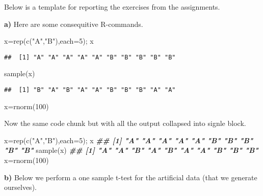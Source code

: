 \documentclass[
  11pt,
]{article}
\newenvironment{Shaded}{\begin{snugshade}}{\end{snugshade}}
\newcommand{\AttributeTok}[1]{\textcolor[rgb]{0.77,0.63,0.00}{#1}}
\newcommand{\DecValTok}[1]{\textcolor[rgb]{0.00,0.00,0.81}{#1}}
\newcommand{\DocumentationTok}[1]{\textcolor[rgb]{0.56,0.35,0.01}{\textbf{\textit{#1}}}}
\newcommand{\FunctionTok}[1]{\textcolor[rgb]{0.00,0.00,0.00}{#1}}
\newcommand{\NormalTok}[1]{#1}
\newcommand{\OtherTok}[1]{\textcolor[rgb]{0.56,0.35,0.01}{#1}}
\newcommand{\StringTok}[1]{\textcolor[rgb]{0.31,0.60,0.02}{#1}}
\begin{document}
Below is a template for reporting the exercises from the assignments.

\textbf{a)} Here are some consequitive R-commands.

\begin{Shaded}
\begin{Highlighting}[]
\NormalTok{x}\OtherTok{=}\FunctionTok{rep}\NormalTok{(}\FunctionTok{c}\NormalTok{(}\StringTok{"A"}\NormalTok{,}\StringTok{"B"}\NormalTok{),}\AttributeTok{each=}\DecValTok{5}\NormalTok{); x}
\end{Highlighting}
\end{Shaded}

\begin{verbatim}
##  [1] "A" "A" "A" "A" "A" "B" "B" "B" "B" "B"
\end{verbatim}

\begin{Shaded}
\begin{Highlighting}[]
\FunctionTok{sample}\NormalTok{(x)}
\end{Highlighting}
\end{Shaded}

\begin{verbatim}
##  [1] "B" "A" "B" "A" "A" "B" "B" "B" "A" "A"
\end{verbatim}

\begin{Shaded}
\begin{Highlighting}[]
\NormalTok{x}\OtherTok{=}\FunctionTok{rnorm}\NormalTok{(}\DecValTok{100}\NormalTok{)}
\end{Highlighting}
\end{Shaded}

Now the same code chunk but with all the output collapsed into signle
block.

\begin{Shaded}
\begin{Highlighting}[]
\NormalTok{x}\OtherTok{=}\FunctionTok{rep}\NormalTok{(}\FunctionTok{c}\NormalTok{(}\StringTok{"A"}\NormalTok{,}\StringTok{"B"}\NormalTok{),}\AttributeTok{each=}\DecValTok{5}\NormalTok{); x}
\DocumentationTok{\#\#  [1] "A" "A" "A" "A" "A" "B" "B" "B" "B" "B"}
\FunctionTok{sample}\NormalTok{(x)}
\DocumentationTok{\#\#  [1] "A" "A" "B" "A" "B" "A" "A" "B" "B" "B"}
\NormalTok{x}\OtherTok{=}\FunctionTok{rnorm}\NormalTok{(}\DecValTok{100}\NormalTok{)}
\end{Highlighting}
\end{Shaded}

\textbf{b)} Below we perform a one sample t-test for the artificial data
(that we generate ourselves).
\end{document}

